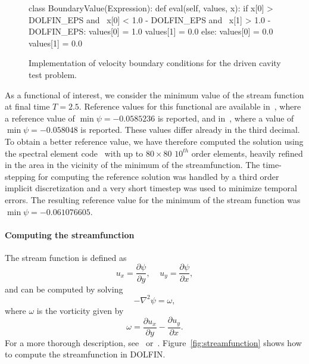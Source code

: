 \begin{figure}[htbp]
  \begin{center}
    \begin{python}
class BoundaryValue(Expression):
    def eval(self, values, x):
        if x[0] > DOLFIN_EPS and \
           x[0] < 1.0 - DOLFIN_EPS and \
           x[1] > 1.0 - DOLFIN_EPS:
            values[0] = 1.0
            values[1] = 0.0
        else:
            values[0] = 0.0
            values[1] = 0.0
    \end{python}
    \caption{Implementation of velocity boundary conditions for the
      driven cavity test problem.}
    \label{fig:bc_drivencavity}
  \end{center}
\end{figure}

As a functional of interest, we consider the minimum value of the
stream function at final time $T = 2.5$. Reference values for this
functional are available in~\cite{transient_dc}, where a reference
value of $\min\psi = -0.0585236$ is reported, and
in~\cite{transient_dc2}, where a value of $\min\psi = -0.058048$ is
reported. These values differ already in the third decimal. To obtain
a better reference value, we have therefore computed the solution
using the spectral element code~\cite{Semtex} with up to $80 \times
80$ $10^{th}$ order elements, heavily refined in the area in the
vicinity of the minimum of the streamfunction. The time-stepping for
computing the reference solution was handled by a third order implicit
discretization and a very short timestep was used to minimize temporal
errors. The resulting reference value for the minimum of the stream
function was $\min\psi =-0.061076605$.

\paragraph{Computing the streamfunction}

The stream function is defined as
\begin{equation} \nonumber
  u_x = \frac{\partial{\psi}}{\partial{y}}, \;\; \;\;  u_y = \frac{\partial{\psi}}{\partial{x}},
\end{equation}
and can be computed by solving
\begin{equation} \nonumber
  -\nabla^2 \psi = \omega,
 \end{equation}
where $\omega$ is the vorticity given by
\begin{equation} \nonumber
  \omega = \frac{\partial{u_x}}{\partial{y}} - \frac{\partial{u_y}}{\partial{x}}.
\end{equation}
For a more thorough description, see~\cite{white} or~\cite{viscous}.
Figure~\ref{fig:streamfunction} shows how to compute the
streamfunction in DOLFIN.

